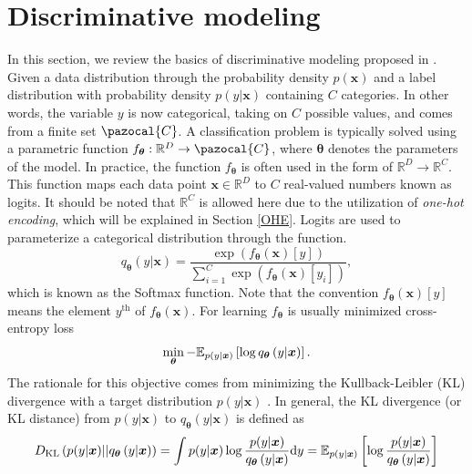 \section{Discriminative modeling}
In this section, we review the basics of discriminative modeling proposed in \cite{HDGEmain}. Given a data distribution through the probability density $p(\boldsymbol{x})$ and a label distribution with probability density $p(y|\boldsymbol{x})$ containing $C$ categories. In other words, the variable $y$ is now categorical, taking on $C$ possible values, and comes from a finite set $\pazocal{C}$.  A classification problem is typically solved using a parametric function $f_{\boldsymbol{\theta}} : \mathbb{R}^D \to \pazocal{C}$, where $\boldsymbol{\theta}$ denotes the parameters of the model. In practice, the function $f_{\boldsymbol{\theta}}$ is often used in the form of $\mathbb{R}^D \to  \mathbb{R}^C$. This function maps each data point $\boldsymbol{x} \in \mathbb{R}^D$ to $C$ real-valued numbers known as logits. It should be noted that $\mathbb{R}^C$ is allowed here due to the utilization of \emph{one-hot encoding}, which will be explained in Section \ref{OHE}. Logits are used to parameterize a categorical distribution through the function.
\begin{equation}\label{softmax}
	q_{\boldsymbol{\theta}}\left(y|\boldsymbol{x}\right) = \frac{\exp\left({f_{\boldsymbol{\theta}}\left(\boldsymbol{x}\right)[y]}\right)}{\sum_{i=1}^C\exp\left({f_{\boldsymbol{\theta}}\left(\boldsymbol{x}\right)[y_i]}\right)},
\end{equation}
which is known as the Softmax function. Note that the convention $f_{\boldsymbol{\theta}}\left(\boldsymbol{x}\right)[y]$ means the element $y^{\mathrm{th}}$ of $f_{\boldsymbol{\theta}}\left(\boldsymbol{x}\right)$. For learning $f_{\boldsymbol{\theta}}$ is usually minimized cross-entropy loss 
\begin{equation}\label{crossentropy}
	\min_{\boldsymbol{\theta}}- \mathbb{E}_{p(y|\boldsymbol{x})}\left[\log q_{\boldsymbol{\theta}}\left(y|\boldsymbol{x}\right)\right].
\end{equation} 
The rationale for this objective comes from minimizing the Kullback-Leibler (KL) divergence with a target distribution $p(y| \boldsymbol{x})$ \cite{KL}. In general, the
KL divergence (or KL distance) from $p(y| \boldsymbol{x})$ to $q_{\boldsymbol{\theta}}\left(y|\boldsymbol{x}\right)$ is defined as
\begin{equation}\label{eq:KLdiv}
D_{\mathrm{KL}} \left(p(y| \boldsymbol{x}) || q_{\boldsymbol{\theta}}\left(y|\boldsymbol{x}\right) \right) = \int p(y| \boldsymbol{x})\log\frac{p(y| \boldsymbol{x})}{q_{\boldsymbol{\theta}}\left(y|\boldsymbol{x}\right)}\mathrm{d}{y} = \mathbb{E}_{p(y| \boldsymbol{x})} \left[\log\frac{p(y| \boldsymbol{x})}{q_{\boldsymbol{\theta}}\left(y|\boldsymbol{x}\right)} \right]
\end{equation}
